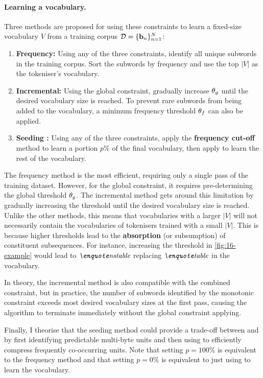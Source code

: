 \paragraph{Learning a vocabulary.} Three methods are proposed for using these constraints to learn a fixed-size vocabulary \(V\) from a training corpus $\mathcal{D} = \{\mathbf{b}_n\}_{n=1}^N$:
\begin{enumerate}
    \item \textbf{Frequency:} Using any of the three constraints, identify all unique subwords in the training corpus. Sort the subwords by frequency and use the top \(|V|\) as the tokeniser's vocabulary.
    \item \textbf{Incremental:} Using the global constraint, gradually increase $\theta_g$ until the desired vocabulary size is reached. To prevent rare subwords from being added to the vocabulary, a minimum frequency threshold $\theta_f$ can also be applied.
    \item \textbf{Seeding \bpe:} Using any of the three constraints, apply the \textbf{frequency cut-off} method to learn a portion $p\%$ of the final vocabulary, then apply \bpe to learn the rest of the vocabulary. 
\end{enumerate}

The frequency method is the most efficient, requiring only a single pass of the training dataset. However, for the global constraint, it requires pre-determining the global threshold $\theta_g$. The incremental method gets around this limitation by gradually increasing the threshold until the desired vocabulary size is reached. Unlike the other methods, this means that vocabularies with a larger \(|V|\) will not necessarily contain the vocabularies of tokenisers trained with a small \(|V|\). This is because higher thresholds lead to the \textbf{absorption} (or subsumption) of constituent subsequences. For instance, increasing the threshold in \cref{fig:16-example} would lead to $\ex{nstable}$ replacing $\ex{table}$ in the vocabulary.

In theory, the incremental method is also compatible with the combined constraint, but in practice, the number of subwords identified by the monotonic constraint exceeds most desired vocabulary sizes at the first pass, causing the algorithm to terminate immediately without the global constraint applying.

Finally, I theorise that the seeding method could provide a trade-off between \bytespan and \bpe by first identifying predictable multi-byte units and then using \bpe to efficiently compress frequently co-occurring units. Note that setting $p=100\%$ is equivalent to the frequency method and that setting  $p=0\%$ is equivalent to just using \bpe to learn the vocabulary.

